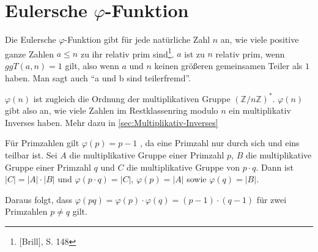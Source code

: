 \section{Eulersche $\varphi$-Funktion}\label{sec:Eulersche-Phi-Funktion}
Die Eulersche $\varphi$-Funktion gibt für jede natürliche Zahl $n$ an, 
wie viele positive ganze Zahlen $a \leq n $ zu ihr relativ prim sind\footnote{[Brill], S. 148}.
$a$ ist zu $n$ relativ prim, wenn $ggT(a,n) = 1$ gilt, also wenn $a$ 
und $n$ keinen größeren gemeinsamen Teiler als $1$ haben. Man sagt 
auch "`a und b sind teilerfremd"'.

$\varphi(n)$ ist zugleich die Ordnung der multiplikativen Gruppe $(\mathbb{Z}/n \mathbb{Z})^*$. 
$\varphi(n)$ gibt also an, wie viele Zahlen im Restklassenring modulo $n$ ein multiplikativ Inverses haben. Mehr dazu in \cref{sec:Multiplikativ-Inverses}

Für Primzahlen gilt $\varphi(p) = p - 1$ , da eine Primzahl nur 
durch sich und eins teilbar ist. Sei $A$ die multiplikative Gruppe 
einer Primzahl $p$, $B$ die multiplikative Gruppe einer Primzahl $q$ 
und $C$ die multiplikative Gruppe von $p \cdot q$. Dann ist $|C| = |A| \cdot |B|$ und 
$\varphi(p \cdot q) = |C|$, $\varphi(p) = |A|$ sowie $\varphi(q) = |B|$.

Daraus folgt, dass $\varphi(pq) = \varphi(p) \cdot \varphi(q) = (p-1) \cdot (q - 1)$ für zwei Primzahlen $p \neq q$ gilt.
